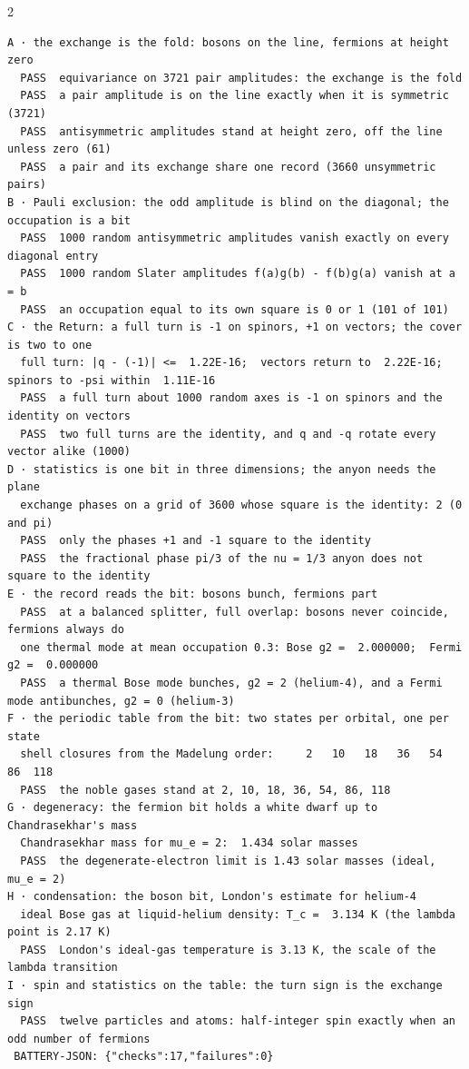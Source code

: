 \documentclass[10pt]{article}
\begin{document}
\begin{multicols}{2}
\begin{Verbatim}[fontsize=\fontsize{6.0}{6.9}\selectfont,breaklines,breakanywhere,breaksymbolleft={}]
A · the exchange is the fold: bosons on the line, fermions at height zero
  PASS  equivariance on 3721 pair amplitudes: the exchange is the fold
  PASS  a pair amplitude is on the line exactly when it is symmetric (3721)
  PASS  antisymmetric amplitudes stand at height zero, off the line unless zero (61)
  PASS  a pair and its exchange share one record (3660 unsymmetric pairs)
B · Pauli exclusion: the odd amplitude is blind on the diagonal; the occupation is a bit
  PASS  1000 random antisymmetric amplitudes vanish exactly on every diagonal entry
  PASS  1000 random Slater amplitudes f(a)g(b) - f(b)g(a) vanish at a = b
  PASS  an occupation equal to its own square is 0 or 1 (101 of 101)
C · the Return: a full turn is -1 on spinors, +1 on vectors; the cover is two to one
  full turn: |q - (-1)| <=  1.22E-16;  vectors return to  2.22E-16;  spinors to -psi within  1.11E-16
  PASS  a full turn about 1000 random axes is -1 on spinors and the identity on vectors
  PASS  two full turns are the identity, and q and -q rotate every vector alike (1000)
D · statistics is one bit in three dimensions; the anyon needs the plane
  exchange phases on a grid of 3600 whose square is the identity: 2 (0 and pi)
  PASS  only the phases +1 and -1 square to the identity
  PASS  the fractional phase pi/3 of the nu = 1/3 anyon does not square to the identity
E · the record reads the bit: bosons bunch, fermions part
  PASS  at a balanced splitter, full overlap: bosons never coincide, fermions always do
  one thermal mode at mean occupation 0.3: Bose g2 =  2.000000;  Fermi g2 =  0.000000
  PASS  a thermal Bose mode bunches, g2 = 2 (helium-4), and a Fermi mode antibunches, g2 = 0 (helium-3)
F · the periodic table from the bit: two states per orbital, one per state
  shell closures from the Madelung order:     2   10   18   36   54   86  118
  PASS  the noble gases stand at 2, 10, 18, 36, 54, 86, 118
G · degeneracy: the fermion bit holds a white dwarf up to Chandrasekhar's mass
  Chandrasekhar mass for mu_e = 2:  1.434 solar masses
  PASS  the degenerate-electron limit is 1.43 solar masses (ideal, mu_e = 2)
H · condensation: the boson bit, London's estimate for helium-4
  ideal Bose gas at liquid-helium density: T_c =  3.134 K (the lambda point is 2.17 K)
  PASS  London's ideal-gas temperature is 3.13 K, the scale of the lambda transition
I · spin and statistics on the table: the turn sign is the exchange sign
  PASS  twelve particles and atoms: half-integer spin exactly when an odd number of fermions
 BATTERY-JSON: {"checks":17,"failures":0}
\end{Verbatim}
\end{multicols}
\end{document}

